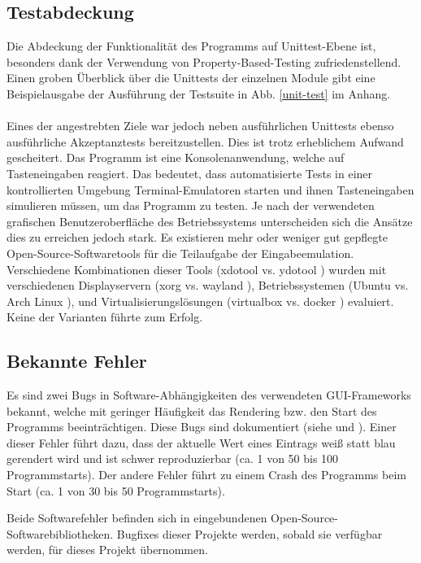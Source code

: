 \subsection{Testabdeckung} \label{Testabdeckung}
Die Abdeckung der Funktionalität des Programms auf Unittest-Ebene ist, besonders
dank der Verwendung von \gls{Property-Based-Testing} \cite{property-based-testing}
zufriedenstellend. Einen groben Überblick über die Unittests der einzelnen Module
gibt eine Beispielausgabe der Ausführung der Testsuite in Abb. \ref{unit-test} im
Anhang.

\paragraph{}
Eines der angestrebten Ziele war jedoch neben ausführlichen Unittests ebenso ausführliche
Akzeptanztests bereitzustellen. Dies ist trotz erheblichem Aufwand gescheitert.
Das Programm ist eine Konsolenanwendung, welche auf Tasteneingaben reagiert. Das
bedeutet, dass automatisierte Tests in einer kontrollierten Umgebung Terminal-Emulatoren
starten und ihnen Tasteneingaben simulieren müssen, um das Programm zu testen. Je nach
der verwendeten grafischen Benutzeroberfläche des Betriebssystems unterscheiden sich
die Ansätze dies zu erreichen jedoch stark. Es existieren mehr oder weniger gut
gepflegte Open-Source-Softwaretools für die Teilaufgabe der Eingabeemulation. Verschiedene
Kombinationen dieser Tools (xdotool \cite{xdotool} vs. ydotool \cite{ydotool}) wurden
mit verschiedenen Displayservern (xorg \cite{xorg} vs. wayland \cite{wayland}),
Betriebssystemen (Ubuntu \cite{ubuntu} vs. Arch Linux \cite{arch}), und
Virtualisierungslösungen (virtualbox \cite{virtualbox} vs. docker \cite{docker})
evaluiert. Keine der Varianten führte zum Erfolg.

\subsection{Bekannte Fehler}
Es sind zwei Bugs in Software-Abhängigkeiten des verwendeten \gls{GUI}-Frameworks
bekannt, welche mit geringer Häufigkeit das \gls{Rendering} bzw. den Start des Programms
beeinträchtigen. Diese Bugs sind dokumentiert (siehe \cite{bug-vty-startup-crash} und
\cite{bug-vty-terminal-capabilities}). Einer dieser Fehler führt dazu, dass der
aktuelle Wert eines Eintrags weiß statt blau gerendert wird und ist schwer
reproduzierbar (ca. 1 von 50 bis 100 Programmstarts). Der andere Fehler führt zu
einem Crash des Programms beim Start (ca. 1 von 30 bis 50 Programmstarts).

Beide Softwarefehler befinden sich in eingebundenen Open-Source-Softwarebibliotheken.
Bugfixes dieser Projekte werden, sobald sie verfügbar werden, für dieses Projekt
übernommen.